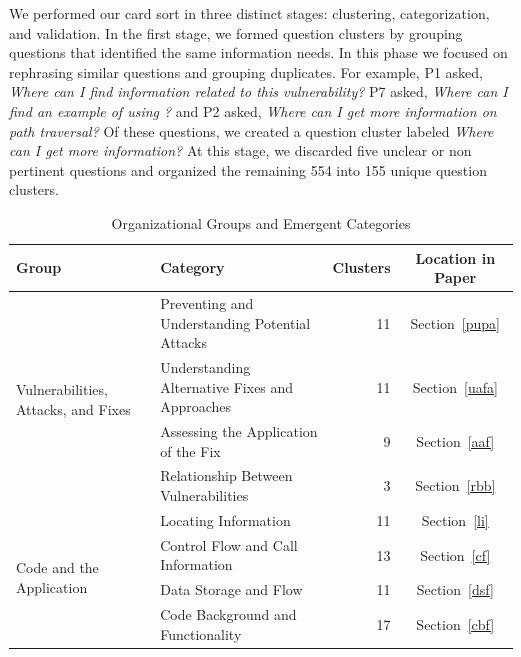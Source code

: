 \documentclass{sig-alternate}
\begin{document}
We performed our card sort in three distinct stages: clustering, categorization, and validation.
In the first stage, we formed question clusters by grouping questions that identified the same information needs. 
In this phase we focused on rephrasing similar questions and grouping duplicates.
For example, P1 asked, \textit{Where can I find information related to this vulnerability?} P7 asked, \textit{Where can I find an example of using ?} and P2 asked, \textit{Where can I get more information on path traversal?} 
Of these questions, we created a question cluster labeled \textit{Where can I get more information?}
At this stage, we discarded five unclear or non pertinent questions and organized the remaining 554 into 155 unique question clusters.


\begin{table} 
\centering
\caption{Organizational Groups and Emergent Categories}
\begin{tabularx}{\textwidth}{|l|X|r|c|}
\rowcolor{gray!50}
\hline
    Group											& Category										& Clusters		& Location in Paper	  	\\
    \hline			
    \multirow{4}{*}{Vulnerabilities, Attacks, and Fixes}
        											& Preventing and Understanding Potential Attacks	& 11     		& Section~\ref{pupa}		\\
        											
        											& Understanding Alternative Fixes and Approaches	& 11     		& Section~\ref{uafa}	\\

    												& Assessing the Application of the Fix				& 9     		& Section~\ref{aaf}				\\

    												& Relationship Between Vulnerabilities							& 3     		& Section~\ref{rbb}			\\
    \hline
    \multirow{6}{*}{Code and the Application}	
    												& Locating Information 								& 11      		& Section~\ref{li}		\\

    												& Control Flow and Call Information					& 13     		& Section~\ref{cf}	\\

    												& Data Storage and Flow								& 11     		& Section~\ref{dsf}  	\\

    												& Code Background and Functionality	 				& 17     		& Section~\ref{cbf}			\\


\end{tabularx}
\end{table}
\end{document}

